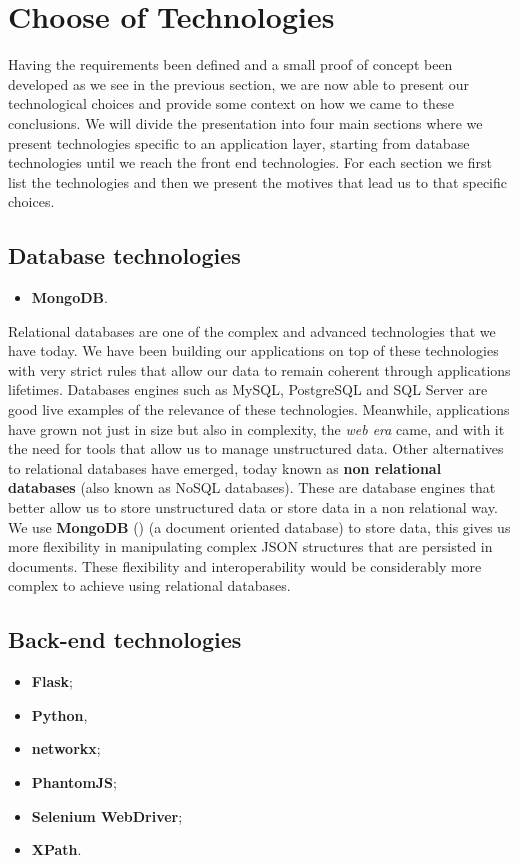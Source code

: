 \section{Choose of Technologies}
Having the requirements been defined and a small proof of concept been developed as we see in the previous section, we are now able to present our technological choices and provide some context on how we came to these conclusions. We will divide the presentation into four main sections where we present technologies specific to an application layer, starting from database technologies until we reach the front end technologies. For each section we first list the technologies and then we present the motives that lead us to that specific choices.

\subsection{Database technologies}
\begin{itemize}
    \item \textbf{MongoDB}.
\end{itemize}

Relational databases are one of the complex and advanced technologies that we have today. We have been building our applications on top of these technologies with very strict rules that allow our data to remain coherent through applications lifetimes. Databases engines such as MySQL, PostgreSQL and SQL Server are good live examples of the relevance of these technologies. Meanwhile, applications have grown not just in size but also in complexity, the \textit{web era} came, and with it the need for tools that allow us to manage unstructured data. Other alternatives to relational databases have emerged, today known as \textbf{non relational databases} (also known as NoSQL databases). These are database engines that better allow us to store unstructured data or store data in a non relational way.\\
\indent We use \textbf{MongoDB} (\cite{mongodb}) (a document oriented database) to store data, this gives us more flexibility in manipulating complex JSON structures that are persisted in documents. These flexibility and interoperability would be considerably more complex to achieve using relational databases.

\subsection{Back-end technologies}
\begin{itemize}
    \item \textbf{Flask};
    \item \textbf{Python},
    \item \textbf{networkx};
    \item \textbf{PhantomJS};
    \item \textbf{Selenium WebDriver};
    \item \textbf{XPath}.
\end{itemize}

